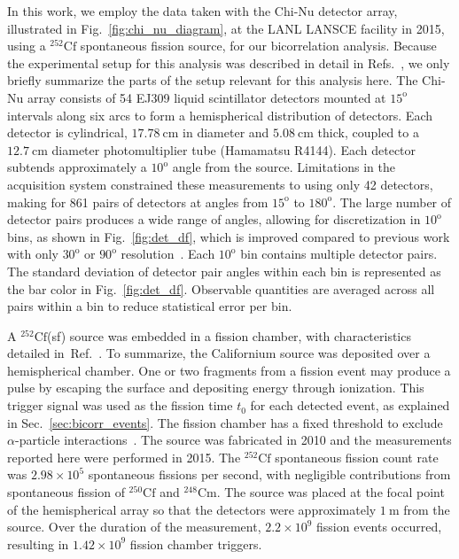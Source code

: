 \documentclass[preprint,12pt]{elsarticle}
\newcommand{\fig}[1]     {Fig.~\ref{#1}}
\newcommand{\secref}[1]  {Sec.~\ref{#1}}
\newcommand{\refref}[1]  {Ref.~\cite{#1}}
\newcommand{\refrefs}[1]  {Refs.~\cite{#1}}
\newcommand{\genunit}[2]{\ensuremath{#1~\text{#2}}\xspace}
\newcommand{\meters}[1] {\genunit{#1}{m}}
\newcommand{\cm}[1]     {\genunit{#1}{cm}}
\newcommand{\degrees}[1]{\ensuremath{#1^{\mathrm{o}}}\xspace}
\newcommand{\Cftft}{\ensuremath{^{252}\text{Cf}}\xspace}
\newcommand{\Cftfo}{\ensuremath{^{250}\text{Cf}}\xspace}
\newcommand{\Cmtfe}{\ensuremath{^{248}\text{Cm}}\xspace}
\begin{document}
In this work, we employ the data taken with the Chi-Nu detector array, illustrated in \fig{fig:chi_nu_diagram}, at the LANL LANSCE facility in 2015, using a \Cftft spontaneous fission source, for our bicorrelation analysis. Because the experimental setup for this analysis was described in detail in \refrefs{Marcath2018,MarcathThesis2018}, we only briefly summarize the parts of the setup relevant for this analysis here. 
The Chi-Nu array consists of 54 EJ309 liquid scintillator detectors mounted at \degrees{15} intervals along six arcs to form a hemispherical distribution of detectors. Each detector is cylindrical, \cm{17.78} in diameter and \cm{5.08} thick, coupled to a \cm{12.7} diameter photomultiplier tube (Hamamatsu R4144). Each detector subtends approximately a \degrees{10} angle from the source.
Limitations in the acquisition system constrained these measurements to using only 42 detectors, making for 861 pairs of detectors at angles from \degrees{15} to \degrees{180}. The large number of detector pairs produces a wide range of angles, allowing for discretization in \degrees{10} bins, as shown in \fig{fig:det_df}, which is improved compared to previous work with only \degrees{30} or \degrees{90} resolution~\cite{Larsen2014,Mueller2016}. Each \degrees{10} bin contains multiple detector pairs. The standard deviation of detector pair angles within each bin is represented as the bar color in \fig{fig:det_df}. Observable quantities are averaged across all pairs within a bin to reduce statistical error per bin. 

A \Cftft(sf) source was embedded in a fission chamber, with characteristics detailed in~\refref{Marcath2018}. To summarize, the Californium source was deposited over a hemispherical chamber. One or two fragments from a fission event may produce a pulse by escaping the surface and depositing energy through ionization. This trigger signal was used as the fission time $t_0$ for each detected event, as explained in \secref{sec:bicorr_events}. The fission chamber has a fixed threshold to exclude $\alpha$-particle interactions~\cite{Oberer2000}. The source was fabricated in 2010 and the measurements reported here were performed in 2015. The \Cftft spontaneous fission count rate was $2.98\times10^5$ spontaneous fissions per second, with negligible contributions from spontaneous fission of \Cftfo and \Cmtfe.  The source was placed at the focal point of the hemispherical array so that the detectors were approximately \meters{1} from the source. Over the duration of the measurement, $2.2\times10^9$ fission events occurred, resulting in $1.42\times10^9$ fission chamber triggers. 
\end{document}
